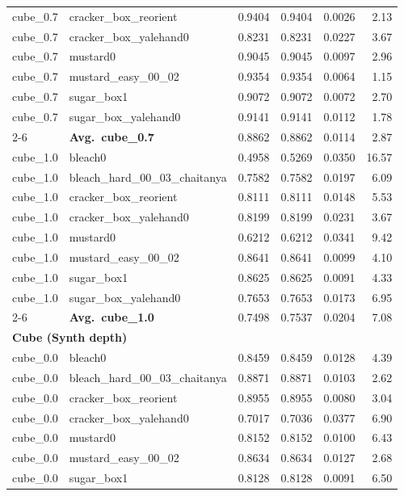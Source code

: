 \begin{longtable}{llrrrr}
  cube_0.7 & cracker\_box\_reorient & 0.9404 & 0.9404 & 0.0026 & 2.13 \\
  cube_0.7 & cracker\_box\_yalehand0 & 0.8231 & 0.8231 & 0.0227 & 3.67 \\
  cube_0.7 & mustard0 & 0.9045 & 0.9045 & 0.0097 & 2.96 \\
  cube_0.7 & mustard\_easy\_00\_02 & 0.9354 & 0.9354 & 0.0064 & 1.15 \\
  cube_0.7 & sugar\_box1 & 0.9072 & 0.9072 & 0.0072 & 2.70 \\
  cube_0.7 & sugar\_box\_yalehand0 & 0.9141 & 0.9141 & 0.0112 & 1.78 \\
  \cmidrule{2-6}
  & \textbf{Avg.~cube_0.7} & 0.8862 & 0.8862 & 0.0114 & 2.87 \\
  \midrule
  cube_1.0 & bleach0 & 0.4958 & 0.5269 & 0.0350 & 16.57 \\
  cube_1.0 & bleach\_hard\_00\_03\_chaitanya & 0.7582 & 0.7582 & 0.0197 & 6.09 \\
  cube_1.0 & cracker\_box\_reorient & 0.8111 & 0.8111 & 0.0148 & 5.53 \\
  cube_1.0 & cracker\_box\_yalehand0 & 0.8199 & 0.8199 & 0.0231 & 3.67 \\
  cube_1.0 & mustard0 & 0.6212 & 0.6212 & 0.0341 & 9.42 \\
  cube_1.0 & mustard\_easy\_00\_02 & 0.8641 & 0.8641 & 0.0099 & 4.10 \\
  cube_1.0 & sugar\_box1 & 0.8625 & 0.8625 & 0.0091 & 4.33 \\
  cube_1.0 & sugar\_box\_yalehand0 & 0.7653 & 0.7653 & 0.0173 & 6.95 \\
  \cmidrule{2-6}
  & \textbf{Avg.~cube_1.0} & 0.7498 & 0.7537 & 0.0204 & 7.08 \\
  \midrule
\multicolumn{6}{l}{\textbf{Cube (Synth depth)}} \\
\midrule
  cube_0.0 & bleach0 & 0.8459 & 0.8459 & 0.0128 & 4.39 \\
  cube_0.0 & bleach\_hard\_00\_03\_chaitanya & 0.8871 & 0.8871 & 0.0103 & 2.62 \\
  cube_0.0 & cracker\_box\_reorient & 0.8955 & 0.8955 & 0.0080 & 3.04 \\
  cube_0.0 & cracker\_box\_yalehand0 & 0.7017 & 0.7036 & 0.0377 & 6.90 \\
  cube_0.0 & mustard0 & 0.8152 & 0.8152 & 0.0100 & 6.43 \\
  cube_0.0 & mustard\_easy\_00\_02 & 0.8634 & 0.8634 & 0.0127 & 2.68 \\
  cube_0.0 & sugar\_box1 & 0.8128 & 0.8128 & 0.0091 & 6.50 \\

\end{longtable}
